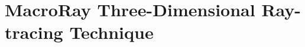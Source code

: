\chapter{MacroRay Three-Dimensional Ray-tracing Technique}{
  \label{ch:MacroRay Three-Dimensional Ray-tracing Technique}
  \blindtext[16]
}
